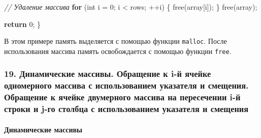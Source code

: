\documentclass[
]{article}
\newenvironment{Shaded}{}{}
\newcommand{\CommentTok}[1]{\textcolor[rgb]{0.38,0.63,0.69}{\textit{#1}}}
\newcommand{\ControlFlowTok}[1]{\textcolor[rgb]{0.00,0.44,0.13}{\textbf{#1}}}
\newcommand{\DataTypeTok}[1]{\textcolor[rgb]{0.56,0.13,0.00}{#1}}
\newcommand{\DecValTok}[1]{\textcolor[rgb]{0.25,0.63,0.44}{#1}}
\newcommand{\NormalTok}[1]{#1}
\newcommand{\OperatorTok}[1]{\textcolor[rgb]{0.40,0.40,0.40}{#1}}
\begin{document}
\begin{Shaded}
\begin{Highlighting}[]
    \CommentTok{// Удаление массива}
    \ControlFlowTok{for} \OperatorTok{(}\DataTypeTok{int}\NormalTok{ i }\OperatorTok{=} \DecValTok{0}\OperatorTok{;}\NormalTok{ i }\OperatorTok{\textless{}}\NormalTok{ rows}\OperatorTok{;} \OperatorTok{++}\NormalTok{i}\OperatorTok{)} \OperatorTok{\{}
\NormalTok{        free}\OperatorTok{(}\NormalTok{array}\OperatorTok{[}\NormalTok{i}\OperatorTok{]);}
    \OperatorTok{\}}
\NormalTok{    free}\OperatorTok{(}\NormalTok{array}\OperatorTok{);}

    \ControlFlowTok{return} \DecValTok{0}\OperatorTok{;}
\OperatorTok{\}}
\end{Highlighting}
\end{Shaded}

В этом примере память выделяется с помощью функции \texttt{malloc}.
После использования массива память освобождается с помощью функции
\texttt{free}.

\subsubsection{19. Динамические массивы. Обращение к i-й ячейке
одномерного массива с использованием указателя и смещения. Обращение к
ячейке двумерного массива на пересечении i-й строки и j-го столбца с
использованием указателя и
смещения}\label{ux434ux438ux43dux430ux43cux438ux447ux435ux441ux43aux438ux435-ux43cux430ux441ux441ux438ux432ux44b.-ux43eux431ux440ux430ux449ux435ux43dux438ux435-ux43a-i-ux439-ux44fux447ux435ux439ux43aux435-ux43eux434ux43dux43eux43cux435ux440ux43dux43eux433ux43e-ux43cux430ux441ux441ux438ux432ux430-ux441-ux438ux441ux43fux43eux43bux44cux437ux43eux432ux430ux43dux438ux435ux43c-ux443ux43aux430ux437ux430ux442ux435ux43bux44f-ux438-ux441ux43cux435ux449ux435ux43dux438ux44f.-ux43eux431ux440ux430ux449ux435ux43dux438ux435-ux43a-ux44fux447ux435ux439ux43aux435-ux434ux432ux443ux43cux435ux440ux43dux43eux433ux43e-ux43cux430ux441ux441ux438ux432ux430-ux43dux430-ux43fux435ux440ux435ux441ux435ux447ux435ux43dux438ux438-i-ux439-ux441ux442ux440ux43eux43aux438-ux438-j-ux433ux43e-ux441ux442ux43eux43bux431ux446ux430-ux441-ux438ux441ux43fux43eux43bux44cux437ux43eux432ux430ux43dux438ux435ux43c-ux443ux43aux430ux437ux430ux442ux435ux43bux44f-ux438-ux441ux43cux435ux449ux435ux43dux438ux44f}

\paragraph{Динамические
массивы}\label{ux434ux438ux43dux430ux43cux438ux447ux435ux441ux43aux438ux435-ux43cux430ux441ux441ux438ux432ux44b}
\end{document}
